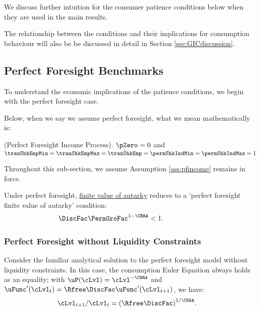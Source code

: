 \documentclass[BufferStockTheory]{subfiles}
\begin{document}
We discuss further intuition for the consumer patience conditions below when they are used in the main results.

The relationship between the conditions and their implications for consumption behaviour will also be be discussed in detail in Section \ref{sec:GICdiscussion}.

\hypertarget{Perfect-Foresight-Benchmarks}{}
\subsection{Perfect Foresight Benchmarks}\label{subsec:PFBbenchmark}
To understand the economic implications of the patience conditions, we begin with the perfect foresight case.

Below, when we say we assume perfect foresight, what we mean mathematically is:
%
\begin{assumI}\label{ass:pfincome}(Perfect Foresight Income Process).
$\pZero=0$ and $\tranShkEmpMin=\tranShkEmpMax=\bar{\tranShkEmp}=\permShkIndMin=\permShkIndMax=1$
\end{assumI}

Throughout this sub-section, we assume Assumption \ref{ass:pfincome} remains in force.

%
Under perfect foresight,  \hyperlink{FVAC}{finite value of autarky} reduces to a `perfect foresight finite value of autarky' condition: 
%
\hypertarget{PFFVAC}{}
\begin{equation}\begin{gathered}\begin{aligned}  
         \DiscFac \PermGroFac^{1-\CRRA}  & <  1.  \phantom{\text{\PFFVAC:~~}}
\end{aligned}\end{gathered}\label{eq:PFFVAC}\end{equation}


\subsubsection{Perfect Foresight without Liquidity Constraints}\label{subsubsec:PFUncon}


Consider the familiar analytical solution to the perfect foresight model without liquidity constraints.
In this case, the consumption Euler Equation always holds as an equality; with $\uP(\cLvl)=\cLvl^{-\CRRA}$ and $\uFunc^{\prime}(\cLvl_{t})=\Rfree\DiscFac\uFunc^{\prime}(\cLvl_{t+1})$, we have:
%
%
\begin{align}
  \cLvl_{t+1}/\cLvl_{t}  & = {(\Rfree\DiscFac)}^{1/\CRRA}. \label{eq:cGroFac}
\end{align} 
%
\end{document}
